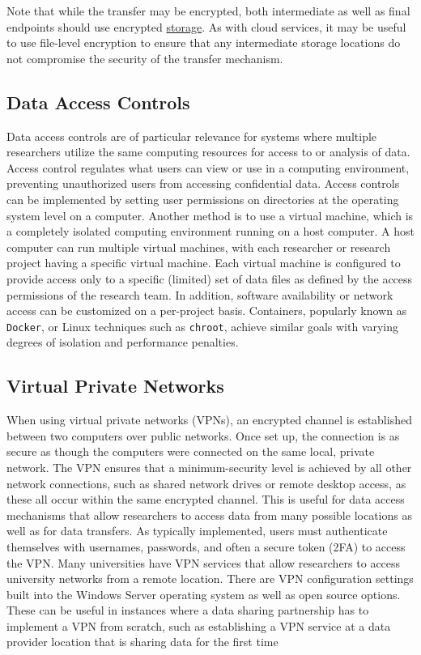 Note that while the transfer may be encrypted, both intermediate as well as final endpoints should use encrypted \protect\hyperlink{storage-of-data}{storage}. As with cloud services, it may be useful to use file-level encryption to ensure that any intermediate storage locations do not compromise the security of the transfer mechanism.

\hypertarget{data-access-controls}{%
\subsection{Data Access Controls}\label{data-access-controls}}

Data access controls are of particular relevance for systems where multiple researchers utilize the same computing resources for access to or analysis of data. Access control regulates what users can view or use in a computing environment, preventing unauthorized users from accessing confidential data. Access controls can be implemented by setting user permissions on directories at the operating system level on a computer. Another method is to use a virtual machine, which is a completely isolated computing environment running on a host computer. A host computer can run multiple virtual machines, with each researcher or research project having a specific virtual machine. Each virtual machine is configured to provide access only to a specific (limited) set of data files as defined by the access permissions of the research team. In addition, software availability or network access can be customized on a per-project basis. Containers, popularly known as \texttt{Docker}, or Linux techniques such as \texttt{chroot}, achieve similar goals with varying degrees of isolation and performance penalties.

\hypertarget{virtual-private-networks}{%
\subsection{Virtual Private Networks}\label{virtual-private-networks}}

When using virtual private networks (VPNs), an encrypted channel is established between two computers over public networks. Once set up, the connection is as secure as though the computers were connected on the same local, private network. The VPN ensures that a minimum-security level is achieved by all other network connections, such as shared network drives or remote desktop access, as these all occur within the same encrypted channel. This is useful for data access mechanisms that allow researchers to access data from many possible locations as well as for data transfers. As typically implemented, users must authenticate themselves with usernames, passwords, and often a secure token (2FA) to access the VPN. Many universities have VPN services that allow researchers to access university networks from a remote location. There are VPN configuration settings built into the Windows Server operating system as well as open source options. These can be useful in instances where a data sharing partnership has to implement a VPN from scratch, such as establishing a VPN service at a data provider location that is sharing data for the first time

